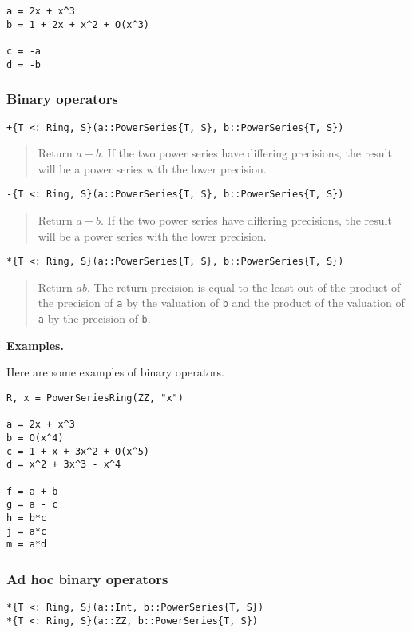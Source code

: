 \documentclass[a4paper,10pt]{article}
\newcommand{\code}{\lstinline}
\newcommand{\desc}[1]{\vspace{-3mm}\begin{quote}#1\end{quote}}
\begin{document}
{{{\begin{lstlisting}
a = 2x + x^3
b = 1 + 2x + x^2 + O(x^3)

c = -a
d = -b
\end{lstlisting}

\subsubsection{Binary operators}

\begin{lstlisting}
+{T <: Ring, S}(a::PowerSeries{T, S}, b::PowerSeries{T, S})
\end{lstlisting}

\desc{Return $a + b$. If the two power series have differing precisions, the
result will be a power series with the lower precision.}

\begin{lstlisting}
-{T <: Ring, S}(a::PowerSeries{T, S}, b::PowerSeries{T, S})
\end{lstlisting}

\desc{Return $a - b$. If the two power series have differing precisions, the
result will be a power series with the lower precision.}

\begin{lstlisting}
*{T <: Ring, S}(a::PowerSeries{T, S}, b::PowerSeries{T, S})
\end{lstlisting}

\desc{Return $ab$. The return precision is equal to the least out of the
product of the precision of \code{a} by the valuation of \code{b} and
the product of the valuation of \code{a} by the precision of \code{b}.}

\textbf{Examples.}

Here are some examples of binary operators.

\begin{lstlisting}
R, x = PowerSeriesRing(ZZ, "x")

a = 2x + x^3
b = O(x^4)
c = 1 + x + 3x^2 + O(x^5)
d = x^2 + 3x^3 - x^4

f = a + b
g = a - c
h = b*c
j = a*c
m = a*d
\end{lstlisting}

\subsubsection{Ad hoc binary operators}

\begin{lstlisting}
*{T <: Ring, S}(a::Int, b::PowerSeries{T, S})
*{T <: Ring, S}(a::ZZ, b::PowerSeries{T, S})
\end{lstlisting}

}}}
\end{document}
